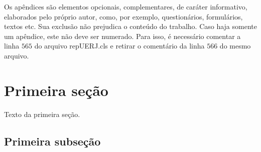 \documentclass[a4paper,12pt,oneside,onecolumn,final,fleqn]{repUERJ}
\begin{document}

\backmatter %




% 
% 




\appendix %


Os apêndices são elementos opcionais, complementares, de caráter informativo, elaborados pelo próprio autor, como, por exemplo, questionários, formulários, textos etc. Sua exclusão não prejudica o conteúdo do trabalho. Caso haja somente um apêndice, este não deve ser numerado. Para isso, é necessário comentar a linha $565$ do arquivo repUERJ.cls e retirar o comentário da linha $566$ do mesmo arquivo.

\section{Primeira seção}

Texto da primeira seção.

\subsection{Primeira subseção}
\end{document}
